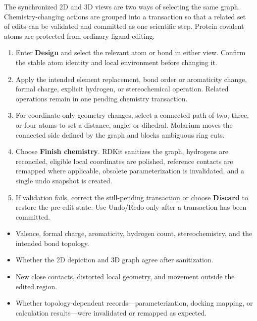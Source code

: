\documentclass[11pt]{article}
\begin{document}

The synchronized 2D and 3D views are two ways of selecting the same graph. Chemistry-changing actions are grouped into a transaction so that a related set of edits can be validated and committed as one scientific step. Protein covalent atoms are protected from ordinary ligand editing.


\begin{enumerate}
\item Enter \textbf{Design} and select the relevant atom or bond in either view. Confirm the stable atom identity and local environment before changing it.
\item Apply the intended element replacement, bond order or aromaticity change, formal charge, explicit hydrogen, or stereochemical operation. Related operations remain in one pending chemistry transaction.
\item For coordinate-only geometry changes, select a connected path of two, three, or four atoms to set a distance, angle, or dihedral. Molarium moves the connected side defined by the graph and blocks ambiguous ring cuts.
\item Choose \textbf{Finish chemistry}. RDKit sanitizes the graph, hydrogens are reconciled, eligible local coordinates are polished, reference contacts are remapped where applicable, obsolete parameterization is invalidated, and a single undo snapshot is created.
\item If validation fails, correct the still-pending transaction or choose \textbf{Discard} to restore the pre-edit state. Use Undo/Redo only after a transaction has been committed.
\end{enumerate}


\begin{itemize}
\item Valence, formal charge, aromaticity, hydrogen count, stereochemistry, and the intended bond topology.
\item Whether the 2D depiction and 3D graph agree after sanitization.
\item New close contacts, distorted local geometry, and movement outside the edited region.
\item Whether topology-dependent records---parameterization, docking mapping, or calculation results---were invalidated or remapped as expected.
\end{itemize}
\end{document}
